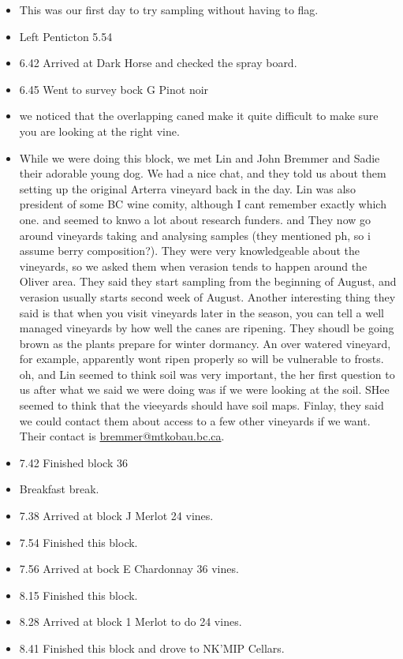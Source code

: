 \documentclass[11pt,letter]{article}
\newenvironment{smitemize}{
\begin{itemize}
  \setlength{\itemsep}{0pt}
  \setlength{\parskip}{0.8pt}
  \setlength{\parsep}{0pt}}
{\end{itemize}
}
\begin{document}
\begin{smitemize}
\item This was our first day to try sampling without having to flag. 
\item Left Penticton 5.54 
\item 6.42 Arrived at Dark Horse and checked the spray board.
\item 6.45 Went to survey bock G Pinot noir
\item we noticed that the overlapping caned make it quite difficult to make sure you are looking at the right vine.
\item While we were doing this block, we met Lin and John Bremmer and Sadie their adorable young dog. We had a nice chat, and they told us about them setting up the original Arterra vineyard back in the day. Lin was also president of some BC wine comity, although I cant remember exactly which one. and seemed to knwo a lot about research funders. and They now go around vineyards taking and analysing samples (they mentioned ph, so i assume berry composition?). They were very knowledgeable about the vineyards, so we asked them when verasion tends to happen around the Oliver area. They said they start sampling from the beginning of August, and verasion usually starts second week of August. Another interesting thing they said is that when you visit vineyards later in the season, you can tell a well managed vineyards by how well the canes are ripening. They shoudl be going brown as the plants prepare for winter dormancy. An over watered vineyard, for example, apparently wont ripen properly so will be vulnerable to frosts. oh, and Lin seemed to think soil was very important, the her first question to us after what we said we were doing was if we were looking at the soil. SHee seemed to think that the vieeyards should have soil maps. Finlay, they said we could contact them about access to a few other vineyards if we want. Their contact is  \href{mailto:bremmer@mtkobau.bc.ca}{bremmer@mtkobau.bc.ca}.
\item 7.42 Finished block 36
\item Breakfast break.
\item 7.38 Arrived at block J Merlot 24 vines.
\item 7.54 Finished this block. 
\item 7.56 Arrived at bock E Chardonnay 36 vines.
\item 8.15 Finished this block. 
\item 8.28 Arrived at block 1 Merlot to do 24 vines. 
\item 8.41 Finished this block and drove to NK'MIP Cellars.

\end{smitemize}
\end{document}
